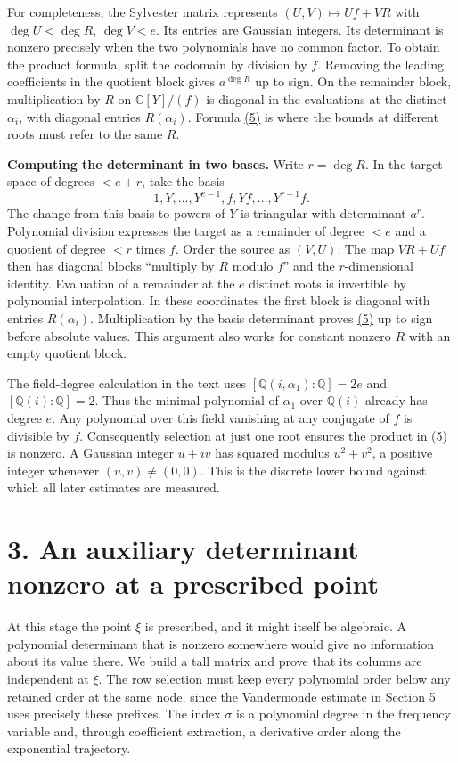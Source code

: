 \documentclass[11pt,a4paper]{article}
\begin{document}
For completeness, the Sylvester matrix represents \((U,V)\mapsto Uf+VR\) with \(\deg U<\deg R\), \(\deg V<e\). Its entries are Gaussian integers. Its determinant is nonzero precisely when the two polynomials have no common factor. To obtain the product formula, split the codomain by division by \(f\). Removing the leading coefficients in the quotient block gives \(a^{\deg R}\) up to sign. On the remainder block, multiplication by \(R\) on \(\mathbb C[Y]/(f)\) is diagonal in the evaluations at the distinct \(\alpha_i\), with diagonal entries \(R(\alpha_i)\). Formula \hyperref[eq:5]{(5)} is where the bounds at different roots must refer to the same \(R\).

\textbf{Computing the determinant in two bases.} Write \(r=\deg R\). In the target space of degrees \(<e+r\), take the basis \[
 1,Y,\ldots,Y^{e-1}, f,Yf,\ldots,Y^{r-1}f .
\] The change from this basis to powers of \(Y\) is triangular with determinant \(a^r\). Polynomial division expresses the target as a remainder of degree \(<e\) and a quotient of degree \(<r\) times \(f\). Order the source as \((V,U)\). The map \(VR+Uf\) then has diagonal blocks ``multiply by \(R\) modulo \(f\)'' and the \(r\)-dimensional identity. Evaluation of a remainder at the \(e\) distinct roots is invertible by polynomial interpolation. In these coordinates the first block is diagonal with entries \(R(\alpha_i)\). Multiplication by the basis determinant proves \hyperref[eq:5]{(5)} up to sign before absolute values. This argument also works for constant nonzero \(R\) with an empty quotient block.

The field-degree calculation in the text uses \([\mathbb Q(i,\alpha_1):\mathbb Q]=2e\) and \([\mathbb Q(i):\mathbb Q]=2\). Thus the minimal polynomial of \(\alpha_1\) over \(\mathbb Q(i)\) already has degree \(e\). Any polynomial over this field vanishing at any conjugate of \(f\) is divisible by \(f\). Consequently selection at just one root ensures the product in \hyperref[eq:5]{(5)} is nonzero. A Gaussian integer \(u+iv\) has squared modulus \(u^2+v^2\), a positive integer whenever \((u,v)\ne(0,0)\). This is the discrete lower bound against which all later estimates are measured.

\section{3. An auxiliary determinant nonzero at a prescribed point}\label{an-auxiliary-determinant-nonzero-at-a-prescribed-point}

At this stage the point \(\xi\) is prescribed, and it might itself be algebraic. A polynomial determinant that is nonzero somewhere would give no information about its value there. We build a tall matrix and prove that its columns are independent at \(\xi\). The row selection must keep every polynomial order below any retained order at the same node, since the Vandermonde estimate in Section 5 uses precisely these prefixes. The index \(\sigma\) is a polynomial degree in the frequency variable and, through coefficient extraction, a derivative order along the exponential trajectory.
\end{document}
